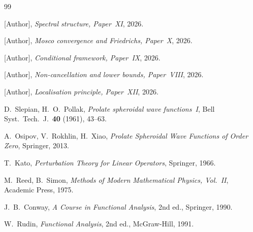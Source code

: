 \documentclass[12pt,a4paper]{amsart}
\theoremstyle{definition}
\theoremstyle{remark}
\begin{document}
\begin{thebibliography}{99}

[Author],
\textit{Spectral structure, Paper~XI}, 2026.

[Author],
\textit{Mosco convergence and Friedrichs, Paper~X}, 2026.

[Author],
\textit{Conditional framework, Paper~IX}, 2026.

[Author],
\textit{Non-cancellation and lower bounds, Paper~VIII}, 2026.

[Author],
\textit{Localisation principle, Paper~XII}, 2026.

D.~Slepian, H.~O.~Pollak,
\textit{Prolate spheroidal wave functions~I},
Bell Syst.\ Tech.\ J.\ \textbf{40} (1961), 43--63.

A.~Osipov, V.~Rokhlin, H.~Xiao,
\textit{Prolate Spheroidal Wave Functions of Order Zero},
Springer, 2013.

T.~Kato, \textit{Perturbation Theory for Linear Operators},
Springer, 1966.

M.~Reed, B.~Simon,
\textit{Methods of Modern Mathematical Physics, Vol.~II},
Academic Press, 1975.

J.~B.~Conway,
\textit{A Course in Functional Analysis}, 2nd ed.,
Springer, 1990.

W.~Rudin, \textit{Functional Analysis}, 2nd ed.,
McGraw-Hill, 1991.

\end{thebibliography}
\end{document}

